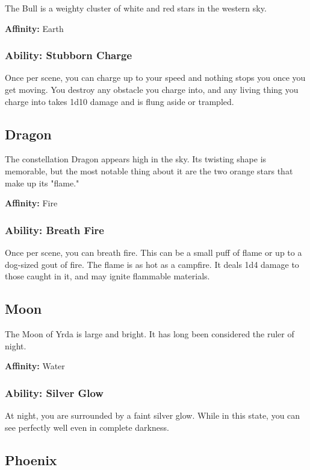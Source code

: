 \begin{multicols}{2}
The Bull is a weighty cluster of white and red stars in
the western sky.

\textbf{Affinity:} Earth

\subsubsection{Ability: Stubborn Charge}

Once per scene, you can charge up to your speed and nothing stops you once you get
moving. You destroy any obstacle you charge into, and any living thing
you charge into takes 1d10 damage and is flung aside or trampled.

\subsection{Dragon}

The constellation Dragon appears high in the sky. Its twisting
shape is memorable, but the most notable thing about it are
the two orange stars that make up its "flame."

\textbf{Affinity:} Fire

\subsubsection{Ability: Breath Fire}

Once per scene, you can breath fire. This can be a small puff of flame
or up to a dog-sized gout of fire. The flame is as hot as a campfire. It
deals 1d4 damage to those caught in it, and may ignite flammable
materials.

\subsection{Moon}

The Moon of Yrda is large and bright. It has long been considered
the ruler of night.

\textbf{Affinity:} Water

\subsubsection{Ability: Silver Glow}

At night, you are surrounded by a faint silver glow. While in this state,
you can see perfectly well even in complete darkness.

\subsection{Phoenix}


\end{multicols}
